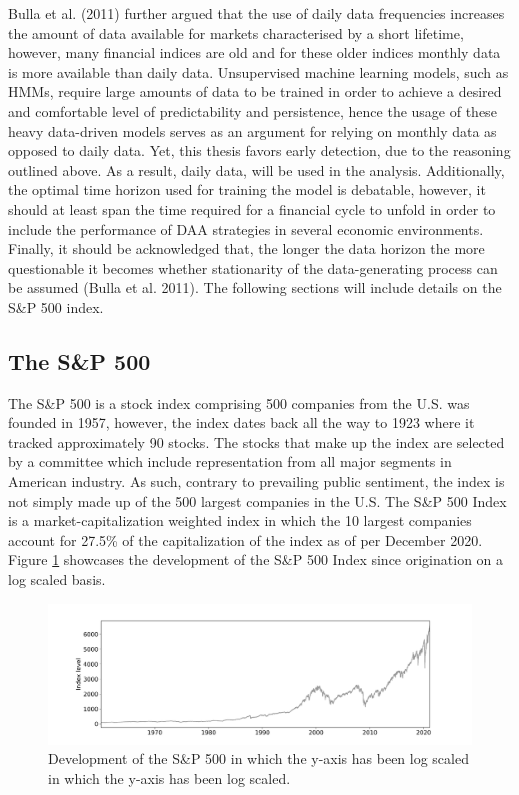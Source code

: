 Bulla et al. (2011) further argued that the use of daily data frequencies increases the amount of data available for markets characterised by a short lifetime, however, many financial indices are old and for these older indices monthly data is more available than daily data. Unsupervised machine learning models, such as HMMs, require large amounts of data to be trained in order to achieve a desired and comfortable level of predictability and persistence, hence the usage of these heavy data-driven models serves as an argument for relying on monthly data as opposed to daily data. Yet, this thesis favors early detection, due to the reasoning outlined above. As a result, daily data, will be used in the analysis. Additionally, the optimal time horizon used for training the model is debatable, however, it should at least span the time required for a financial cycle to unfold in order to include the performance of DAA strategies in several economic environments. Finally, it should be acknowledged that, the longer the data horizon the more questionable it becomes whether stationarity of the data-generating process can be assumed (Bulla et al. 2011). The following sections will include details on the S\&P 500 index.
 
\subsection{The S\&P 500}
The S\&P 500 is a stock index comprising 500 companies from the U.S. was founded in 1957, however, the index dates back all the way to 1923 where it tracked approximately 90 stocks. The stocks that make up the index are selected by a committee which include representation from all major segments in American industry. As such, contrary to prevailing public sentiment, the index is not simply made up of the 500 largest companies in the U.S. The S\&P 500 Index is a market-capitalization weighted index in which the 10 largest companies account for 27.5\% of the capitalization of the index as of per December 2020. Figure \ref{fig: SP500_index} showcases the development of the S\&P 500 Index since origination on a log scaled basis. 
 
\begin{figure}[H] 
    \centering
    \includegraphics[width=1\textwidth]{analysis/data_description/images/SP500_index.png}
    \caption [Development of the S\&P 500] {Development of the S\&P 500 in which the y-axis has been log scaled in which the y-axis has been log scaled.}
    \label{fig: SP500_index}
\end{figure}

